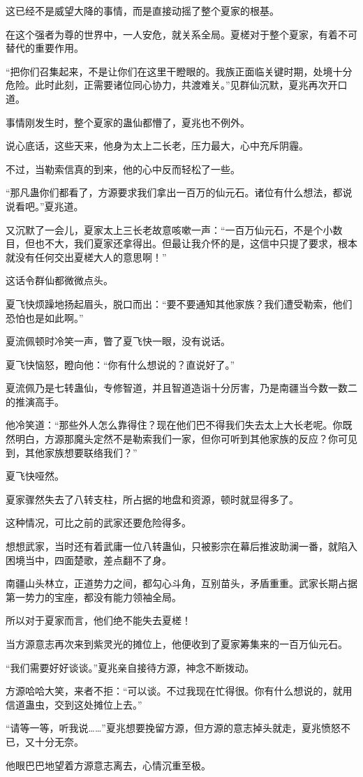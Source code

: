 \begin{this_body}
这已经不是威望大降的事情，而是直接动摇了整个夏家的根基。

在这个强者为尊的世界中，一人安危，就关系全局。夏槎对于整个夏家，有着不可替代的重要作用。

“把你们召集起来，不是让你们在这里干瞪眼的。我族正面临关键时期，处境十分危险。此时此刻，正需要诸位同心协力，共渡难关。”见群仙沉默，夏兆再次开口道。

事情刚发生时，整个夏家的蛊仙都懵了，夏兆也不例外。

说心底话，这些天来，他身为太上二长老，压力最大，心中充斥阴霾。

不过，当勒索信真的到来，他的心中反而轻松了一些。

“那凡蛊你们都看了，方源要求我们拿出一百万的仙元石。诸位有什么想法，都说说看吧。”夏兆道。

又沉默了一会儿，夏家太上三长老故意咳嗽一声：“一百万仙元石，不是个小数目，但也不大，我们夏家还拿得出。但最让我介怀的是，这信中只提了要求，根本就没有任何交出夏槎大人的意思啊！”

这话令群仙都微微点头。

夏飞快烦躁地扬起眉头，脱口而出：“要不要通知其他家族？我们遭受勒索，他们恐怕也是如此啊。”

夏流佩顿时冷笑一声，瞥了夏飞快一眼，没有说话。

夏飞快恼怒，瞪向他：“你有什么想说的？直说好了。”

夏流佩乃是七转蛊仙，专修智道，并且智道造诣十分厉害，乃是南疆当今数一数二的推演高手。

他冷笑道：“那些外人怎么靠得住？现在他们巴不得我们失去太上大长老呢。你既然明白，方源那魔头定然不是勒索我们一家，但你可听到其他家族的反应？你可见到，其他家族想要联络我们？”

夏飞快哑然。

夏家骤然失去了八转支柱，所占据的地盘和资源，顿时就显得多了。

这种情况，可比之前的武家还要危险得多。

想想武家，当时还有着武庸一位八转蛊仙，只被影宗在幕后推波助澜一番，就陷入困境当中，四面楚歌，差点翻不了身。

南疆山头林立，正道势力之间，都勾心斗角，互别苗头，矛盾重重。武家长期占据第一势力的宝座，都没有能力领袖全局。

所以对于夏家而言，他们绝不能失去夏槎！

当方源意志再次来到紫灵光的摊位上，他便收到了夏家筹集来的一百万仙元石。

“我们需要好好谈谈。”夏兆亲自接待方源，神念不断拨动。

方源哈哈大笑，来者不拒：“可以谈。不过我现在忙得很。你有什么想说的，就用信道蛊虫，交到这处摊位上去。”

“请等一等，听我说……”夏兆想要挽留方源，但方源的意志掉头就走，夏兆愤怒不已，又十分无奈。

他眼巴巴地望着方源意志离去，心情沉重至极。

\end{this_body}

